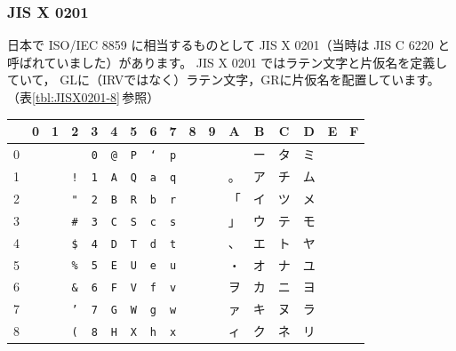 \documentclass[a4j,10pt,fleqn]{jsarticle}
\begin{document}
\subsubsection{JIS X 0201} \label{sec:JISX0201}

日本で ISO/IEC 8859 に相当するものとして JIS X 0201（当時は JIS C 6220 と呼ばれていました）があります。
JIS X 0201 ではラテン文字と片仮名を定義していて，
GLに（IRVではなく）ラテン文字，GRに片仮名を配置しています。
（表\ref{tbl:JISX0201-8}\,参照）

\begin{table}[htp]
\begin{center}\begin{tabular}{|c||c|c|c|c|c|c|c|c|c|c|c|c|c|c|c|c|}
    \hline
       & 0 & 1  & 2          & 3          & 4             & 5          & 6             & 7          & 8 & 9 & A  & B  & C  & D  & E & F \\ \hline \hline
    0  & ~ & ~  &            & \texttt{0} & \texttt{@}    & \texttt{P} & \texttt{`}    & \texttt{p} & ~ & ~ &    & ー & タ & ミ & ~ & ~ \\ \hline
    1  & ~ & ~  & \texttt{!} & \texttt{1} & \texttt{A}    & \texttt{Q} & \texttt{a}    & \texttt{q} & ~ & ~ & 。 & ア & チ & ム & ~ & ~ \\ \hline
    2  & ~ & ~  & \texttt{"} & \texttt{2} & \texttt{B}    & \texttt{R} & \texttt{b}    & \texttt{r} & ~ & ~ & 「 & イ & ツ & メ & ~ & ~ \\ \hline
    3  & ~ & ~ & \texttt{\#} & \texttt{3} & \texttt{C}    & \texttt{S} & \texttt{c}    & \texttt{s} & ~ & ~ & 」 & ウ & テ & モ & ~ & ~ \\ \hline
    4  & ~ & ~ & \texttt{\$} & \texttt{4} & \texttt{D}    & \texttt{T} & \texttt{d}    & \texttt{t} & ~ & ~ & 、 & エ & ト & ヤ & ~ & ~ \\ \hline
    5  & ~ & ~ & \texttt{\%} & \texttt{5} & \texttt{E}    & \texttt{U} & \texttt{e}    & \texttt{u} & ~ & ~ & ・ & オ & ナ & ユ & ~ & ~ \\ \hline
    6  & ~ & ~ & \texttt{\&} & \texttt{6} & \texttt{F}    & \texttt{V} & \texttt{f}    & \texttt{v} & ~ & ~ & ヲ & カ & ニ & ヨ & ~ & ~ \\ \hline
    7  & ~ & ~  & \texttt{'} & \texttt{7} & \texttt{G}    & \texttt{W} & \texttt{g}    & \texttt{w} & ~ & ~ & ァ & キ & ヌ & ラ & ~ & ~ \\ \hline
    8  & ~ & ~  & \texttt{(} & \texttt{8} & \texttt{H}    & \texttt{X} & \texttt{h}    & \texttt{x} & ~ & ~ & ィ & ク & ネ & リ & ~ & ~ \\ \hline

\end{tabular}
\end{center}
\end{table}
\end{document}
